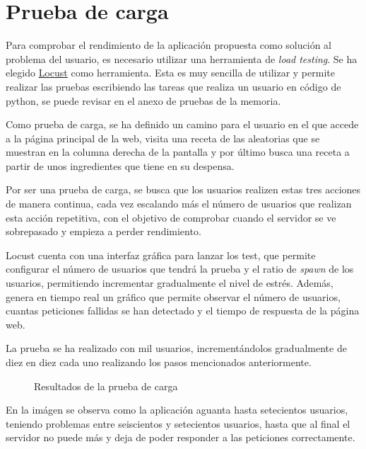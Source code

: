 \section{Prueba de carga}
Para comprobar el rendimiento de la aplicación propuesta como solución al problema del usuario, es necesario utilizar una herramienta de \emph{load testing}. Se ha elegido \href{https://locust.io/}{Locust} como herramienta. Esta es muy sencilla de utilizar y permite realizar las pruebas escribiendo las tareas que realiza un usuario en código de \Gls{python}, se puede revisar en el anexo de pruebas de la memoria.

Como prueba de carga, se ha definido un camino para el usuario en el que accede a la página principal de la web, visita una receta de las aleatorias que se muestran en la columna derecha de la pantalla y por último busca una receta a partir de unos ingredientes que tiene en su despensa.

Por ser una prueba de carga, se busca que los usuarios realizen estas tres acciones de manera continua, cada vez escalando más el número de usuarios que realizan esta acción repetitiva, con el objetivo de comprobar cuando el servidor se ve sobrepasado y empieza a perder rendimiento. 

Locust cuenta con una interfaz gráfica para lanzar los \gls{test}, que permite configurar el número de usuarios que tendrá la prueba y el ratio de \emph{spawn} de los usuarios, permitiendo incrementar gradualmente el nivel de estrés. Además, genera en tiempo real un gráfico que permite observar el número de usuarios, cuantas peticiones fallidas se han detectado y el tiempo de respuesta de la página web.

La prueba se ha realizado con mil usuarios, incrementándolos gradualmente de diez en diez cada uno realizando los pasos mencionados anteriormente. 

\begin{figure}[H]
    \caption{Resultados de la prueba de carga}
    \label{fig:Daniel-pasos2}
\end{figure}

En la imágen se observa como la aplicación aguanta hasta setecientos usuarios, teniendo problemas entre seiscientos y setecientos usuarios, hasta que al final el servidor no puede más y deja de poder responder a las peticiones correctamente.